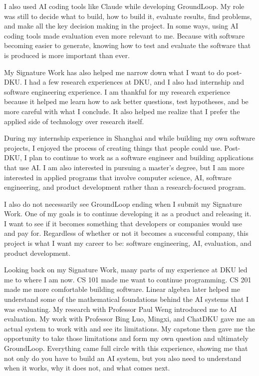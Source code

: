 \documentclass[12pt, a4paper, oneside]{report}
\begin{document}
I also used AI coding tools like Claude while developing GroundLoop. My role was still to decide what to build, how to build it, evaluate results, find problems, and make all the key decision making in the project. In some ways, using AI coding tools made evaluation even more relevant to me. Because with software becoming easier to generate, knowing how to test and evaluate the software that is produced is more important than ever.

My Signature Work has also helped me narrow down what I want to do post-DKU. I had a few research experiences at DKU, and I also had internship and software engineering experience. I am thankful for my research experience because it helped me learn how to ask better questions, test hypotheses, and be more careful with what I conclude. It also helped me realize that I prefer the applied side of technology over research itself.

During my internship experience in Shanghai and while building my own software projects, I enjoyed the process of creating things that people could use. Post-DKU, I plan to continue to work as a software engineer and building applications that use AI. I am also interested in pursuing a master's degree, but I am more interested in applied programs that involve computer science, AI, software engineering, and product development rather than a research-focused program.

I also do not necessarily see GroundLoop ending when I submit my Signature Work. One of my goals is to continue developing it as a product and releasing it. I want to see if it becomes something that developers or companies would use and pay for. Regardless of whether or not it becomes a successful company, this project is what I want my career to be: software engineering, AI, evaluation, and product development.

Looking back on my Signature Work, many parts of my experience at DKU led me to where I am now. CS 101 made me want to continue programming. CS 201 made me more comfortable building software. Linear algebra later helped me understand some of the mathematical foundations behind the AI systems that I was evaluating. My research with Professor Paul Weng introduced me to AI evaluation. My work with Professor Bing Luo, Mingxi, and ChatDKU gave me an actual system to work with and see its limitations. My capstone then gave me the opportunity to take those limitations and form my own question and ultimately GroundLoop. Everything came full circle with this experience, showing me that not only do you have to build an AI system, but you also need to understand when it works, why it does not, and what comes next.
\end{document}
